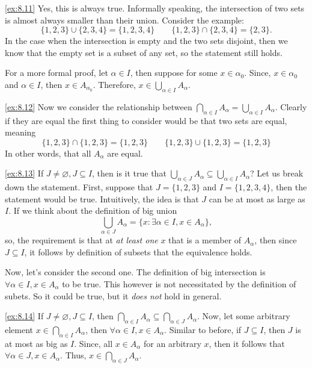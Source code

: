 \begin{solution}\label{sol:8.11}\ref{ex:8.11}
    Yes, this is always true. Informally speaking, the intersection of two sets is almost always smaller than their union. Consider the example: 
    $$
    \{ 1,2,3 \}\cup \{ 2,3,4 \}= \{ 1,2,3,4 \} \quad\quad \{ 1,2,3 \}\cap \{ 2,3,4 \}=\{ 2,3 \}.
    $$
    In the case when the intersection is empty and the two sets disjoint, then we know that the empty set is a subset of any set, so the statement still holds. 

    For a more formal proof, let $\alpha\in I$, then suppose for some $x\in\alpha_{0}$. Since, $x\in\alpha_{0}$ and $\alpha\in I$, then $x\in A_{\alpha_{0}}$. Therefore, $x\in\bigcup_{\alpha\in I}A_{\alpha}$.
\end{solution}

\begin{solution}\label{sol:8.12}\ref{ex:8.12}
    Now we consider the relationship between $\bigcap_{\alpha\in I}A_{\alpha}=\bigcup_{\alpha\in I}A_{\alpha}$. Clearly if they are equal the first thing to consider would be that two sets are equal, meaning 
    $$
    \{ 1,2,3 \}\cap \{ 1,2,3 \}=\{ 1,2,3 \} \quad\quad \{ 1,2,3 \}\cup \{ 1,2,3 \}=\{ 1,2,3 \}
    $$
    In other words, that all $A_{\alpha}$ are equal. 
\end{solution}

\begin{solution}\label{sol:8.13}\ref{ex:8.13}
    If $J\ne\varnothing, J\subseteq I$, then is it true that $\bigcup_{\alpha\in J}A_{\alpha}\subseteq \bigcup_{\alpha\in I}A_{\alpha}$? Let us break down the statement. First, suppose that $J=\{ 1,2,3 \}$ and $I=\{ 1,2,3,4 \}$, then the statement would be true. Intuitively, the idea is that $J$ can be at most as large as $I$. If we think about the definition of big union 
    $$
    \bigcup_{\alpha\in J}A_\alpha=\{ x: \exists \alpha \in I, x\in A_\alpha \},
    $$
    so, the requirement is that at \emph{at least one} $x$ that is a member of $A_{\alpha}$, then since $J\subseteq I$, it follows by definition of subsets that the equivalence holds. 
    
    Now, let's consider the second one. The definition of big intersection is $\forall \alpha \in I, x\in A_{\alpha}$ to be true. This however is not necessitated by the definition of subets. So it could be true, but it \emph{does not} hold in general. 
\end{solution}

\begin{solution}\label{sol:8.14}\ref{ex:8.14}
    If $J\ne\varnothing,J\subseteq I$, then $\bigcap_{\alpha\in I}A_{\alpha}\subseteq \bigcap_{\alpha \in J}A_{\alpha}$. Now, let some arbitrary element $x\in \bigcap_{\alpha\in I}A_{\alpha}$, then $\forall \alpha \in I, x\in A_{\alpha}$. Similar to before, if $J\subseteq I$, then $J$ is at most as big as $I$. Since, all $x\in A_{\alpha}$ for an arbitrary $x$, then it follows that $\forall \alpha \in J, x \in A_{\alpha}$. Thus, $x\in\bigcap_{\alpha\in J}A_{\alpha}$.
\end{solution}